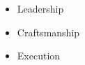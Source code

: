 %
%
%

\twocolumnsection
{
\begin{skills}
\end{skills}}
{
\vspace{1em}
\begin{itemize}
	\item Leadership
	\item Craftsmanship                    
        \item Execution
\end{itemize}
}
